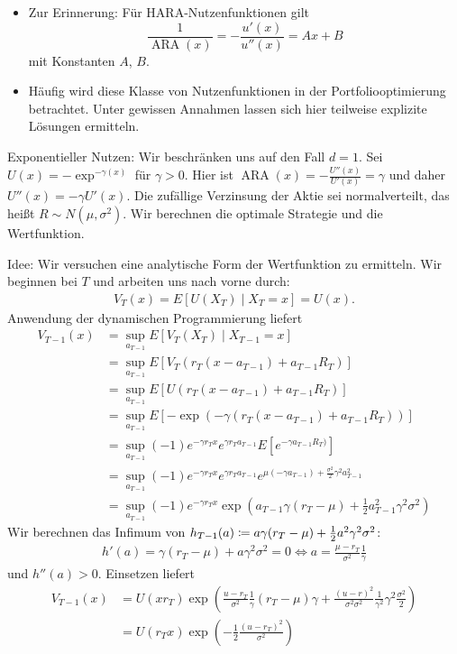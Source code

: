 \documentclass[a4paper,twoside,DIV15,BCOR12mm]{scrbook}
\DeclareMathOperator{\ARA}{ARA}
\begin{document}
\begin{bemerkung}
\begin{itemize}
\item Zur Erinnerung: Für HARA-Nutzenfunktionen gilt
\[
\frac{1}{\ARA(x)} = -\frac{u'(x)}{u''(x)} = Ax+B
\]
mit Konstanten $A$, $B$.
\item Häufig wird diese Klasse von Nutzenfunktionen in der Portfoliooptimierung betrachtet. Unter gewissen Annahmen lassen sich hier teilweise explizite Lösungen ermitteln.
\end{itemize}
\end{bemerkung}

\begin{beispiel}
Exponentieller Nutzen: Wir beschränken uns auf den Fall $d=1$. Sei $U(x) = - \exp^{-\gamma(x)}$ für $\gamma>0$. Hier ist $\ARA(x) = -\frac{U''(x)}{U'(x)} = \gamma$ und daher $U''(x) = -\gamma U'(x)$. Die zufällige Verzinsung der Aktie sei normalverteilt, das heißt $R\sim N(\mu, \sigma^2)$. Wir berechnen die optimale Strategie und die Wertfunktion.

Idee: Wir versuchen eine analytische Form der Wertfunktion zu ermitteln. Wir beginnen bei $T$ und arbeiten uns nach vorne durch:
\begin{align*}
V_T(x) = E[U(X_T)\mid X_T=x] = U(x).
\end{align*}
Anwendung der dynamischen Programmierung liefert
\begin{align*}
V_{T-1}(x) &= \sup_{a_{T-1}} E[V_T(X_T) \mid X_{T-1}=x]\\
&= \sup_{a_{T-1}} E[V_T(r_T (x-a_{T-1}) + a_{T-1}R_T)] \\
&= \sup_{a_{T-1}} E[U(r_T(x-a_{T-1}) + a_{T-1} R_T)] \\
&= \sup_{a_{T-1}} E[-\exp(-\gamma (r_T(x-a_{T-1}) + a_{T-1} R_T))] \\
&= \sup_{a_{T-1}} (-1) e^{-\gamma r_Tx} e^{\gamma r_T a_{T-1}} E[e^{-\gamma a_{T-1} R_T)}] \\
&= \sup_{a_{T-1}} (-1) e^{-\gamma r_Tx} e^{\gamma r_T a_{T-1}} e^{\mu(-\gamma a_{T-1}) + \frac{\sigma^2}{2} \gamma^2 a_{T-1}^2} \\
&= \sup_{a_{T-1}} (-1) e^{-\gamma r_Tx} \exp(a_{T-1} \gamma(r_T -\mu) + \frac12 a_{T-1}^2 \gamma^2  \sigma^2)
\end{align*}
Wir berechnen das Infimum von $h_{T-1}(a) \da a\gamma (r_T-\mu) + \frac12 a^2\gamma^2 \sigma^2$:
\begin{align*}
h'(a) = \gamma(r_T-\mu) + a\gamma^2 \sigma^2 = 0 \iff a= \frac{\mu-r_T}{\sigma^2} \frac 1 \gamma
\end{align*}
und $h''(a) >0$. Einsetzen liefert
\begin{align*}
V_{T-1}(x) &= U(xr_T) \exp (\frac{u-r_T}{\sigma^2} \frac1\gamma (r_T - \mu) \gamma + \frac{(u-r)^2}{\sigma^2\sigma^2} \frac1{\gamma^2} \gamma^2 \frac{\sigma^2}{2}) \\
&= U(r_Tx) \exp(-\frac12 \frac{(u- r_T)^2}{\sigma^2})
\end{align*}


\end{beispiel}
\end{document}

